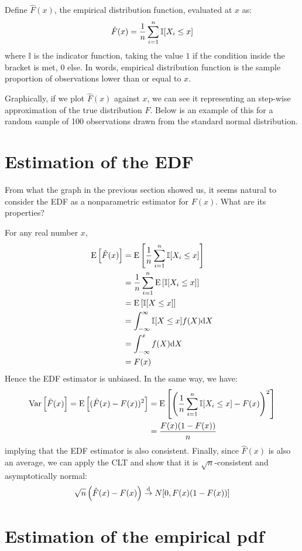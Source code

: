 \begin{definition}
Define $\hat F(x)$, the empirical distribution function, evaluated at $x$ as: $$\hat F(x) = \frac{1}{n} \sum_{i=1}^{n}\mathbb{I}[X_i\leq x]$$ where $\mathbb{I}$ is the indicator function, taking the value $1$ if the condition inside the bracket is met, $0$ else. In words, empirical distribution function is the sample proportion of observations lower than or equal to $x$.
\end{definition}

Graphically, if we plot $\hat F(x)$ against $x$, we can see it representing an step-wise approximation of the true distribution $F$. Below is an example of this for a random sample of 100 observations drawn from the standard normal distribution.



\section{Estimation of the EDF}

From what the graph in the previous section showed us, it seems natural to consider the EDF as a nonparametric estimator for $F(x)$. What are its properties?

For any real number $x$,\begin{align*}
\operatorname{E}\left[\hat F(x)\right] & = \operatorname{E}\left[\frac{1}{n} \sum_{i=1}^{n}\mathbb{I}[X_i\leq x]\right] \\
& = \frac{1}{n} \sum_{i=1}^{n}\operatorname{E}\left[\mathbb{I}[X_i\leq x]\right] \\ & = \operatorname{E}\left[\mathbb{I}[X\leq x]\right] \\
& = \int_{-\infty}^{\infty} \mathbb{I}[X\leq x]f(X)\mathrm{d} X \\
& = \int_{-\infty}^{x} f(X)\mathrm{d} X \\ & = F(x)
\end{align*}
Hence the EDF estimator is unbiased. In the same way, we have: \begin{align*}
\operatorname{Var}\left[\hat F(x)\right] = \operatorname{E}\left[(\hat F(x) - F(x))^2\right] & = \operatorname{E}\left[\left(\frac{1}{n} \sum_{i=1}^{n}\mathbb{I}[X_i\leq x] - F(x)\right)^2\right] \\
& = \frac{F(x)(1 - F(x))}{n}
\end{align*} implying that the EDF estimator is also consistent. Finally, since $\hat F(x)$ is also an average, we can apply the CLT and show that it is $\sqrt{n}$-consistent and asymptotically normal: $$\sqrt{n}\left(\hat F(x) - F(x)\right) \overset{\text{d}}{\to} N[0,F(x)(1 - F(x))] $$ 

\section{Estimation of the empirical pdf}

